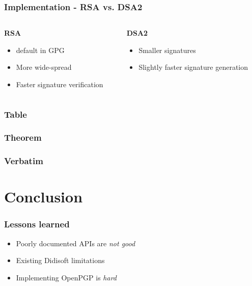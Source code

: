\documentclass{beamer}
\begin{document}
\begin{frame}
\frametitle{Implementation - RSA vs. DSA2}
\begin{columns}[onlytextwidth]
\begin{column}{0.45\textwidth} %
\centering
\textbf{RSA}
\begin{itemize}
\item default in GPG \cite{wk}
\item More wide-spread
\item Faster signature verification
\end{itemize}
\end{column}

\begin{column}{0.45\textwidth} %
\centering
\textbf{DSA2}
\begin{itemize}
\item Smaller signatures
\item Slightly faster signature generation
\end{itemize}
\end{column}
\end{columns}
\end{frame}


\begin{frame}
\frametitle{Table}
\end{frame}


\begin{frame}
\frametitle{Theorem}
\end{frame}


\begin{frame}[fragile] %
\frametitle{Verbatim}
\end{frame}


\section{Conclusion}
\begin{frame}
\frametitle{Lessons learned}
\begin{itemize}
\item Poorly documented APIs are \emph{not good}
\item Existing Didisoft limitations \cite{dd}
\item Implementing OpenPGP is \emph{hard}
\end{itemize}
\end{frame}
\end{document}
